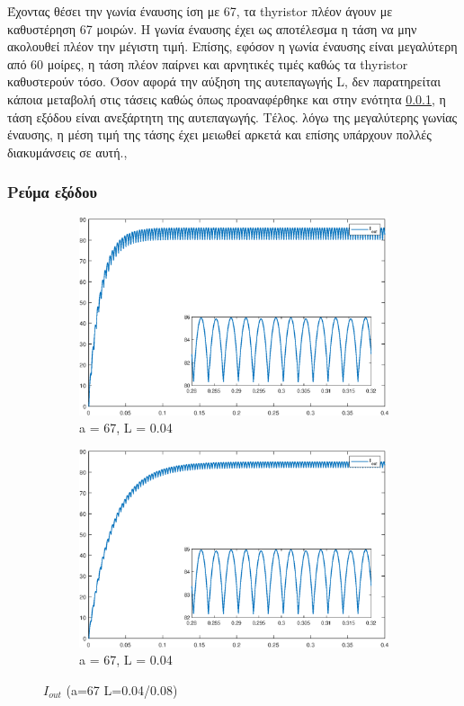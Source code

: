 \noindent
Έχοντας θέσει την γωνία έναυσης ίση με 67, τα thyristor πλέον άγουν με καθυστέρηση 67 μοιρών. 
Η γωνία έναυσης έχει ως αποτέλεσμα η τάση να μην ακολουθεί πλέον την μέγιστη τιμή. Επίσης, εφόσον η γωνία έναυσης είναι μεγαλύτερη από 60 μοίρες, η τάση πλέον παίρνει και αρνητικές τιμές καθώς τα thyristor καθυστερούν τόσο. Όσον αφορά την αύξηση της αυτεπαγωγής L, δεν παρατηρείται κάποια μεταβολή στις τάσεις καθώς όπως προαναφέρθηκε και στην ενότητα \ref{}, η τάση εξόδου είναι ανεξάρτητη της αυτεπαγωγής. Τέλος. λόγω της μεγαλύτερης γωνίας έναυσης, η μέση τιμή της τάσης έχει μειωθεί αρκετά και επίσης υπάρχουν πολλές διακυμάνσεις σε αυτή.,

\subsubsection{Ρεύμα εξόδου}

\begin{figure}[h]
	\centering
	\begin{subfigure}{.5\textwidth}
		\centering
		\includegraphics[width =1\textwidth]{Images/3_Iout_67_04}
		\caption{a = 67, L = 0.04}
		\label{fig:3_iout_67_04}
	\end{subfigure}%
	\begin{subfigure}{.5\textwidth}
		\centering
		\includegraphics[width = 1\textwidth]{Images/3_Iout_67_08}
		\caption{a = 67, L = 0.04}
		\label{fig:3_iout_67_08}
	\end{subfigure}
	\caption{$I_{out} $ (a=67 L=0.04/0.08)}
	\label{figs:3_iout_67}
\end{figure}

